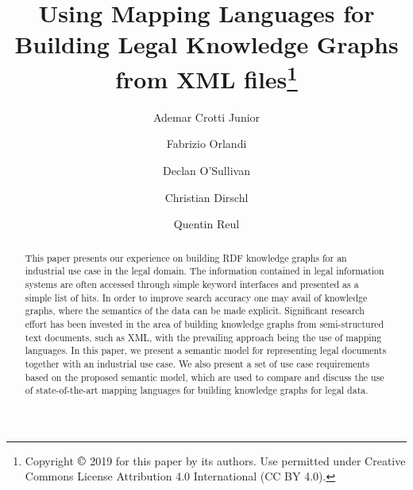 \documentclass[runningheads]{llncs}
\begin{document}
%
\title{Using Mapping Languages for Building Legal Knowledge
Graphs from XML files\thanks{Copyright $\copyright$ 2019 for this paper by its authors. Use permitted under Creative Commons License Attribution 4.0 International (CC BY 4.0).}}
%
%
\author{Ademar Crotti Junior\and
Fabrizio Orlandi\and
Declan O'Sullivan\and 
Christian Dirschl
\and Quentin Reul}
%
%
%
\maketitle              %
%
\begin{abstract}
This paper presents our experience on building RDF knowledge graphs for an industrial use case in the legal domain. The information contained in legal information systems are often accessed through simple keyword interfaces and presented as a simple list of hits. In order to improve search accuracy one may avail of knowledge graphs, where the semantics of the data can be made explicit. Significant research effort has been invested in the area of building knowledge graphs from semi-structured text documents, such as XML, with the prevailing approach being the use of mapping languages. In this paper, we present a semantic model for representing legal documents together with an industrial use case. We also present a set of use case requirements based on the proposed semantic model, which are used to compare and discuss the use of state-of-the-art mapping languages for building knowledge graphs for legal data.
\end{abstract}
\end{document}
